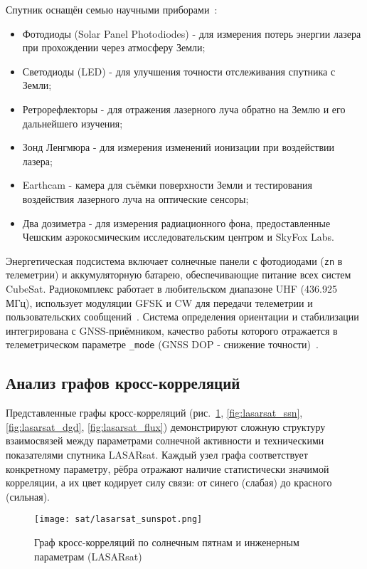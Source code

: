 Спутник оснащён семью научными приборами~\cite{wiki_lasarsat, lasar_info}:
\begin{itemize}
	\item Фотодиоды (Solar Panel Photodiodes) - для измерения потерь энергии лазера при прохождении через атмосферу Земли;
	\item Светодиоды (LED) - для улучшения точности отслеживания спутника с Земли;
	\item Ретрорефлекторы - для отражения лазерного луча обратно на Землю и его дальнейшего изучения;
	\item Зонд Ленгмюра - для измерения изменений ионизации при воздействии лазера;
	\item Earthcam - камера для съёмки поверхности Земли и тестирования воздействия лазерного луча на оптические сенсоры;
	\item Два дозиметра - для измерения радиационного фона, предоставленные Чешским аэрокосмическим исследовательским центром и SkyFox Labs.
\end{itemize}

Энергетическая подсистема включает солнечные панели с фотодиодами (\texttt{zn} в
телеметрии) и аккумуляторную батарею, обеспечивающие питание всех систем
CubeSat. Радиокомплекс работает в любительском диапазоне UHF (436.925 МГц),
использует модуляции GFSK и CW для передачи телеметрии и пользовательских
сообщений~\cite{satnogs_lasarsat, spacemanic_lasarsat}. Система определения
ориентации и стабилизации интегрирована с GNSS-приёмником, качество работы
которого отражается в телеметрическом параметре \texttt{\_mode} (GNSS DOP -
снижение точности)~\cite{spacemanic_lasarsat, satnogs_lasarsat}.

\subsection{Анализ графов кросс-корреляций}

Представленные графы кросс-корреляций
(рис.~\ref{fig:lasarsat_sunspot},
\ref{fig:lasarsat_ssn},
\ref{fig:lasarsat_dgd},
\ref{fig:lasarsat_flux})
демонстрируют сложную структуру взаимосвязей между параметрами солнечной
активности и техническими показателями спутника LASARsat. Каждый узел графа
соответствует конкретному параметру, рёбра отражают наличие статистически
значимой корреляции, а их цвет кодирует силу связи: от синего (слабая) до
красного (сильная).

\begin{figure}[H]
	\centering
	\texttt{[image: sat/lasarsat\_sunspot.png]}
	\caption{Граф кросс-корреляций по солнечным пятнам и инженерным параметрам (LASARsat)}
	\label{fig:lasarsat_sunspot}
\end{figure}

